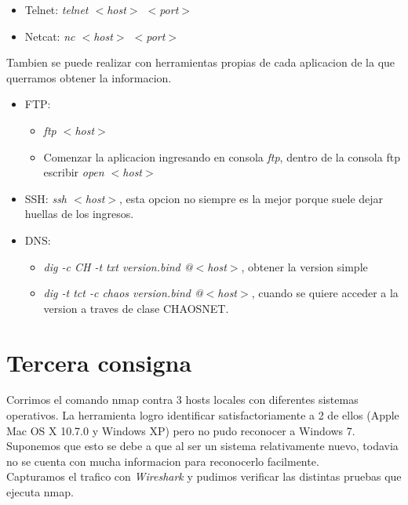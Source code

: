 \documentclass[a4paper]{article}
\begin{document}
\begin{itemize}
\item Telnet: \textit{telnet $<$host$>$  $<$port$>$}

\item Netcat: \textit{nc $<$host$>$ $<$port$>$}
\end{itemize} 

\clearpage

Tambien se puede realizar con herramientas propias de cada aplicacion de la que querramos obtener la informacion.

\begin{itemize}
\item FTP: \begin{itemize}
			\item \textit{ftp $<$host$>$}
			\item Comenzar la aplicacion ingresando en consola \textit{ftp}, dentro de la consola ftp escribir \textit{open $<$host$>$}
			\end{itemize}
			
\item SSH: \textit{ssh $<$host$>$}, esta opcion no siempre es la mejor porque suele dejar huellas de los ingresos.

\item DNS: \begin{itemize}
			\item \textit{dig -c CH -t txt version.bind @$<$host$>$}, obtener la version simple
			\item \textit{dig -t tct -c chaos version.bind @$<$host$>$}, cuando se quiere acceder a la version a traves de clase CHAOSNET.
			\end{itemize}
			
\end{itemize}


\section{Tercera consigna}

Corrimos el comando nmap contra 3 hosts locales con diferentes sistemas operativos. La herramienta logro identificar satisfactoriamente a 2 de ellos (Apple Mac OS X 10.7.0 y Windows XP) pero no pudo reconocer a Windows 7. Suponemos que esto se debe a que al ser un sistema relativamente nuevo, todavia no se cuenta con mucha informacion para reconocerlo facilmente. \\


Capturamos el trafico con \textit{Wireshark} y pudimos verificar las distintas pruebas que ejecuta nmap.\\
\end{document}
